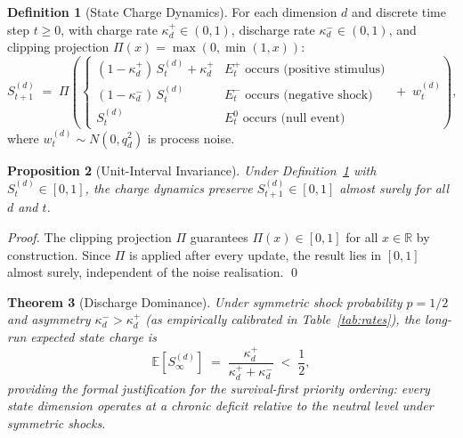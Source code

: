 \documentclass[12pt,openany]{book}
\numberwithin{equation}{chapter}
\theoremstyle{plain}
\newtheorem{theorem}{Theorem}[chapter]
\newtheorem{proposition}[theorem]{Proposition}
\theoremstyle{definition}
\newtheorem{definition}[theorem]{Definition}
\theoremstyle{remark}
\def\mathcal#1{#1}%
\begin{document}
\begin{definition}[State Charge Dynamics]
\label{def:charge}
For each dimension $d$ and discrete time step $t \geq 0$, with
charge rate $\kappa_d^+ \in (0,1)$, discharge rate
$\kappa_d^- \in (0,1)$, and clipping projection
$\Pi(x) = \max(0,\min(1,x))$:
\begin{equation}
  \mathcal{S}_{t+1}^{(d)} \;=\;
  \Pi\!\left(\begin{cases}
    (1-\kappa_d^+)\,\mathcal{S}_t^{(d)} + \kappa_d^+
      & E_t^+ \text{ occurs (positive stimulus)} \\[2pt]
    (1-\kappa_d^-)\,\mathcal{S}_t^{(d)}
      & E_t^- \text{ occurs (negative shock)} \\[2pt]
    \mathcal{S}_t^{(d)}
      & E_t^0 \text{ occurs (null event)}
  \end{cases}
  \;+\; w_t^{(d)}\right),
  \label{eq:charge-dynamics}
\end{equation}
where $w_t^{(d)} \sim \mathcal{N}(0, q_d^2)$ is process noise.
\end{definition}

\begin{proposition}[Unit-Interval Invariance]
\label{prop:invariant}
Under Definition~\ref{def:charge} with
$\mathcal{S}_t^{(d)} \in [0,1]$, the charge dynamics preserve
$\mathcal{S}_{t+1}^{(d)} \in [0,1]$ almost surely for all
$d$ and $t$.
\end{proposition}

\begin{proof}
The clipping projection $\Pi$ guarantees $\Pi(x) \in [0,1]$
for all $x \in \mathbb{R}$ by construction.  Since
$\Pi$ is applied after every update, the result lies in $[0,1]$
almost surely, independent of the noise realisation.
\qed
\end{proof}

\begin{theorem}[Discharge Dominance]
\label{thm:discharge}
Under symmetric shock probability $p = 1/2$ and asymmetry
$\kappa_d^- > \kappa_d^+$ (as empirically calibrated in
Table~\ref{tab:rates}), the long-run expected state charge is
\begin{equation}
  \mathbb{E}\!\left[\mathcal{S}_\infty^{(d)}\right]
  \;=\; \frac{\kappa_d^+}{\kappa_d^+ + \kappa_d^-}
  \;<\; \frac{1}{2},
  \label{eq:discharge-dominance}
\end{equation}
providing the formal justification for the survival-first
priority ordering: every state dimension operates at a chronic
deficit relative to the neutral level under symmetric shocks.
\end{theorem}
\end{document}
